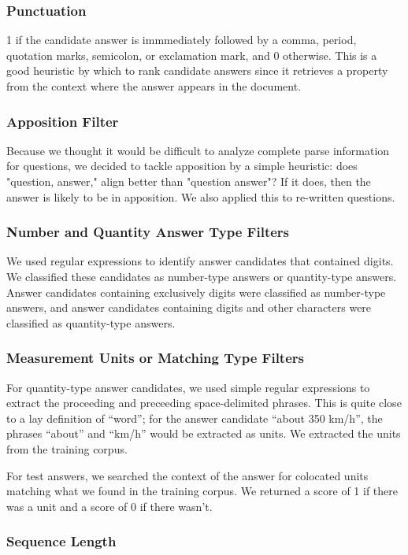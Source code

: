 \documentclass{article}
\begin{document}
\subsubsection{Punctuation}

	1 if the candidate answer is immmediately followed by a comma, period,
	quotation marks, semicolon, or exclamation mark, and 0 otherwise. This is a
	good heuristic by which to rank candidate answers since it retrieves a
	property from the context where the answer appears in the document.

\subsubsection{Apposition Filter}

	Because we thought it would be difficult to analyze complete parse
	information for questions, we decided to tackle apposition by a simple
	heuristic:  does "question, answer," align better than "question answer"?
	If it does, then the answer is likely to be in apposition.  We also applied
	this to re-written questions.


\subsubsection{Number and Quantity Answer Type Filters}
We used regular expressions to identify answer candidates that contained digits.
We classified these candidates as number-type answers or quantity-type answers.
Answer candidates containing exclusively digits were classified as number-type
answers, and answer candidates containing digits and other characters were classified
as quantity-type answers.

\subsubsection{Measurement Units or Matching Type Filters}
For quantity-type answer candidates, we used simple regular expressions to extract
the proceeding and preceeding space-delimited phrases. This is quite close to a
lay definition of ``word''; for the answer candidate ``about 350 km/h'', the
phrases ``about'' and ``km/h'' would be extracted as units. We extracted the units
from the training corpus.

For test answers, we searched the context of the answer for colocated units
matching what we found in the training corpus. We returned a score of 1 if there
was a unit and a score of 0 if there wasn't.
\subsubsection{Sequence Length}
\end{document}
